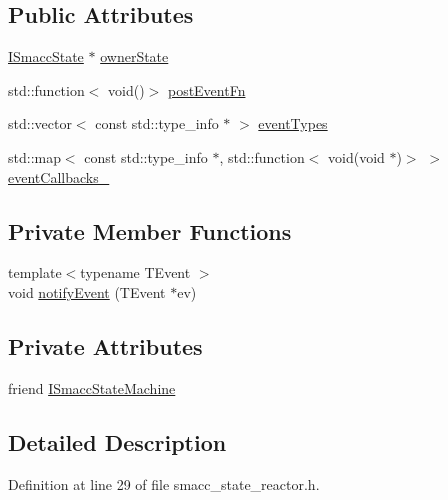 \subsection*{Public Attributes}
\begin{DoxyCompactItemize}
\item 
\hyperlink{classsmacc_1_1ISmaccState}{I\+Smacc\+State} $\ast$ \hyperlink{classsmacc_1_1StateReactor_aabd30af9412a8fea9ec5906f173d9d4a}{owner\+State}
\item 
std\+::function$<$ void()$>$ \hyperlink{classsmacc_1_1StateReactor_a1d97ae5c1689b6716c60c19c94a7eeae}{post\+Event\+Fn}
\item 
std\+::vector$<$ const std\+::type\+\_\+info $\ast$ $>$ \hyperlink{classsmacc_1_1StateReactor_a65c8ddfce40e7859e5c73fff1cf6c04b}{event\+Types}
\item 
std\+::map$<$ const std\+::type\+\_\+info $\ast$, std\+::function$<$ void(void $\ast$)$>$ $>$ \hyperlink{classsmacc_1_1StateReactor_a63cce05c412f3699cc1b15af9aeaf8af}{event\+Callbacks\+\_\+}
\end{DoxyCompactItemize}
\subsection*{Private Member Functions}
\begin{DoxyCompactItemize}
\item 
{\footnotesize template$<$typename T\+Event $>$ }\\void \hyperlink{classsmacc_1_1StateReactor_a9e1b551ab97d1c18b2e1bb60a60455da}{notify\+Event} (T\+Event $\ast$ev)
\end{DoxyCompactItemize}
\subsection*{Private Attributes}
\begin{DoxyCompactItemize}
\item 
friend \hyperlink{classsmacc_1_1StateReactor_ad488bca73fa841277318d8b94c3a9421}{I\+Smacc\+State\+Machine}
\end{DoxyCompactItemize}


\subsection{Detailed Description}


Definition at line 29 of file smacc\+\_\+state\+\_\+reactor.\+h.



